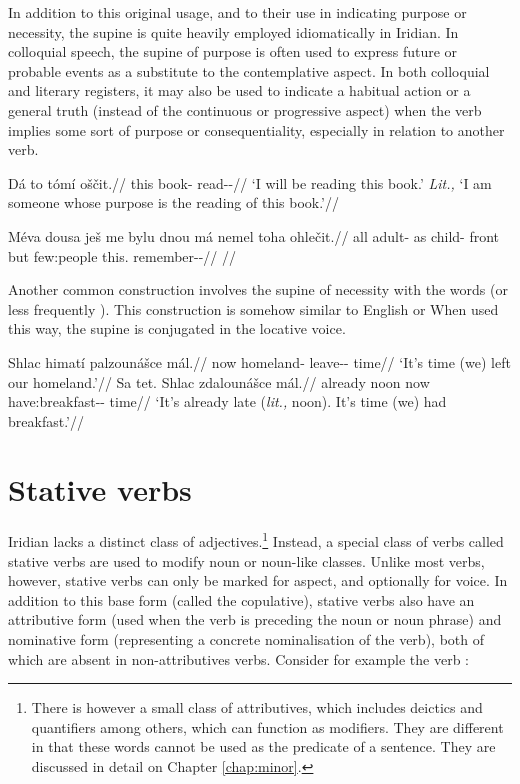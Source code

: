 In addition to this original usage, and to their use in indicating purpose or necessity, the supine is quite heavily employed idiomatically in Iridian. In colloquial speech, the supine of purpose is often used to express future or probable events as a substitute to the contemplative aspect. In both colloquial and literary registers, it may also be used to indicate a habitual action or a general truth (instead of the continuous or progressive aspect) when the verb implies some sort of purpose or consequentiality, especially in relation to another verb.

\pex
\begingl
\gla Dá to tómí oščit.//
\glb \First{}\Sg{} this book-\Gen{} read-\Av{}-\SupP{}//
\glft `I will be reading this book.' \emph{Lit.,} `I am someone whose purpose is the reading of this book.'//
\endgl
\xe

\pex
\begingl
\gla Méva dousa ješ me bylu dnou má nemel toha ohlečit.//
\glb all adult-\Acc{} \Exst{} as child-\Ins{} front but few:people this.\Acc{} remember-\Av{}-\SupP{}//
\glft {}//
\endgl
\xe

Another common construction involves the supine of necessity with the words   (or less frequently ). This construction is somehow similar to English  or  When used this way, the supine is conjugated in the locative voice.

\pex
\begingl
\gla Shlac himatí palzounášce mál.//
\glb now homeland-\Gen{} leave-\Lv{}-\SupN{} time//
\glft `It's time (we) left our homeland.'//
\endgl
\xe
\pex
\begingl
\gla Sa tet. Shlac zdalounášce mál.//
\glb already noon now have:breakfast-\Lv{}-\SupN{} time//
\glft `It's already late (\emph{lit.,} noon). It's time (we) had breakfast.'//
\endgl
\xe

\section{Stative verbs}\label{sec:statives}

Iridian lacks a distinct class of adjectives.\footnote{There is however a small class of attributives, which includes deictics and quantifiers among others, which can function as modifiers. They are different in that these words cannot be used as the predicate of a sentence. They are discussed in detail on Chapter \ref{chap:minor}.} Instead, a special class of verbs called {\cscaps stative verbs} are used to modify noun or noun-like classes. Unlike most verbs, however, stative verbs can only be marked for aspect, and optionally for voice. In addition to this base form (called the {\cscaps copulative}), stative verbs also have an {\cscaps attributive} form (used when the verb is preceding the noun or noun phrase) and {\cscaps nominative} form (representing a concrete nominalisation of the verb), both of which are absent in non-attributives verbs. Consider for example the verb  :

